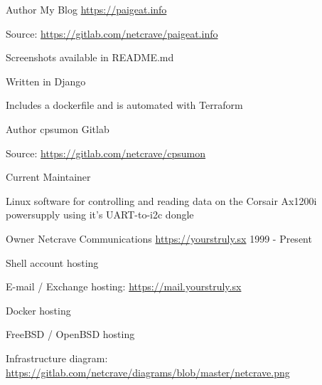 \begin{cventries}
    \cventry
    {Author}
    {My Blog}
    {\url{https://paigeat.info}}
    {}
    {
      \begin{cvitems} 
        \item {Source: \url{https://gitlab.com/netcrave/paigeat.info}}
        \item {Screenshots available in README.md}
        \item {Written in Django}
        \item {Includes a dockerfile and is automated with Terraform}
      \end{cvitems}
    }

    \cventry
    {Author}
    {cpsumon}
    {Gitlab}
    {}
    {
      \begin{cvitems} 
        \item {Source: \url{https://gitlab.com/netcrave/cpsumon}}
        \item {Current Maintainer}
        \item {Linux software for controlling and reading data on the Corsair Ax1200i powersupply using it's UART-to-i2c dongle}        
      \end{cvitems}
    }

    \cventry
    {Owner}
    {Netcrave Communications}
    {\url{https://yourstruly.sx}}
    {1999 - Present}
    {
      \begin{cvitems}        
        \item {Shell account hosting}
        \item {E-mail / Exchange hosting: \url{https://mail.yourstruly.sx}}
        \item {Docker hosting}
        \item {FreeBSD / OpenBSD hosting}
        \item {Infrastructure diagram: \url{https://gitlab.com/netcrave/diagrams/blob/master/netcrave.png}}
      \end{cvitems}
    }

\end{cventries}
